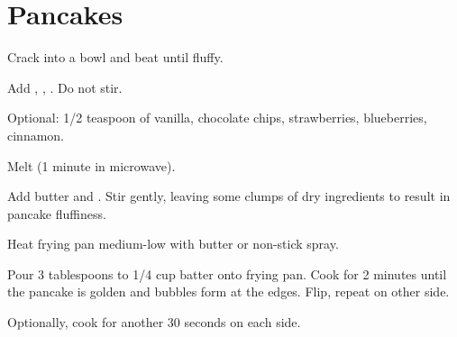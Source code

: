 \section{Pancakes}

Crack  into a bowl and beat until fluffy.

Add
,
,
.
Do not stir.

Optional: 
1/2 teaspoon of vanilla,
chocolate chips,
strawberries,
blueberries,
cinnamon.

Melt  (1 minute in microwave).

Add butter and .
Stir gently, leaving some clumps of dry ingredients
to result in pancake fluffiness.

Heat frying pan medium-low with butter or non-stick spray.

Pour 3 tablespoons to 1/4 cup batter onto frying pan.
Cook for 2 minutes until the pancake is golden and
bubbles form at the edges.
Flip, repeat on other side.

Optionally, cook for another 30 seconds on each side.

